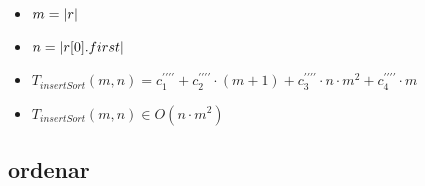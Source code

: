 \documentclass{article}
\begin{document}
    \begin{minipage}{0.70\textwidth}
        
    \end{minipage}
    \hfill
    \begin{minipage}{0.25\textwidth}
    \end{minipage}

    \begin{itemize}
        \item $m = |r|$
        \item $n = |r[0].first|$
        \item $T_{insertSort}(m, n) = c^{\prime\prime\prime\prime}_1 +
                                   c^{\prime\prime\prime\prime}_2 \cdot (m+1) +
                                   c^{\prime\prime\prime\prime}_3 \cdot n \cdot m^2 +
                                   c^{\prime\prime\prime\prime}_4 \cdot m$
        \item $T_{insertSort}(m, n) \in O(n \cdot m^{2})$
    \end{itemize}

    \subsection*{ordenar}

    \begin{minipage}{0.70\textwidth}
        
    \end{minipage}
    \hfill
    \begin{minipage}{0.25\textwidth}
    \end{minipage}
\end{document}

